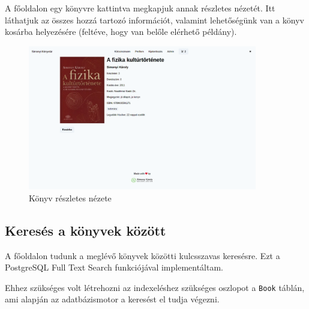 A főoldalon egy könyvre kattintva megkapjuk annak részletes nézetét. Itt láthatjuk az összes hozzá tartozó információt, valamint
lehetőségünk van a könyv kosárba helyezésére (feltéve, hogy van belőle elérhető példány).

\begin{figure}[!ht]
  \centering
  \includegraphics[width=100mm, keepaspectratio]{figures/book-detail-view.png}
  \caption{Könyv részletes nézete}
  \label{fig:BookDetailView}
\end{figure}

\subsection{Keresés a könyvek között}

A főoldalon tudunk a meglévő könyvek közötti kulcsszavas keresésre. Ezt a PostgreSQL Full Text Search funkciójával implementáltam.

Ehhez szükséges volt létrehozni az indexeléshez szükséges oszlopot a \lstinline|Book| táblán, ami alapján az adatbázismotor a keresést
el tudja végezni.

